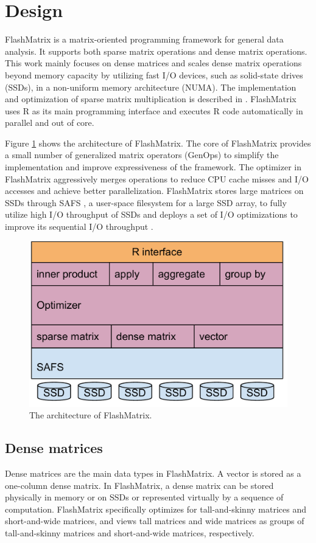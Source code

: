 \section{Design}

FlashMatrix is a matrix-oriented programming framework for general data analysis.
It supports both sparse matrix operations and dense matrix operations. This work
mainly focuses on dense matrices and scales dense matrix operations beyond
memory capacity by utilizing fast I/O devices, such as solid-state drives (SSDs),
in a non-uniform memory architecture (NUMA). The implementation and optimization
of sparse matrix multiplication is described in \cite{SEM_SpMM}.
FlashMatrix uses R as its main programming interface and executes R code
automatically in parallel and out of core.

Figure \ref{fig:arch} shows the architecture of FlashMatrix. The core of
FlashMatrix provides a small number of generalized matrix operators (GenOps)
to simplify the implementation and improve expressiveness of
the framework. The optimizer in FlashMatrix aggressively merges operations to
reduce CPU cache misses and I/O accesses and achieve better parallelization.
FlashMatrix stores large matrices on SSDs through SAFS \cite{safs},
a user-space filesystem for a large SSD array, to fully utilize high I/O
throughput of SSDs and deploys a set of I/O optimizations to improve
its sequential I/O throughput \cite{SEM_SpMM}.

\begin{figure}
\centering
\includegraphics[scale=0.3]{FlashMatrix_figs/architecture.pdf}
\caption{The architecture of FlashMatrix.}
\label{fig:arch}
\end{figure}

\subsection{Dense matrices}
Dense matrices are the main data types in FlashMatrix. A vector is stored
as a one-column dense matrix. In FlashMatrix, a dense matrix can be stored
physically in memory or on SSDs or represented virtually by a sequence of
computation. FlashMatrix specifically optimizes for tall-and-skinny matrices
and short-and-wide matrices, and views tall matrices and wide matrices
as groups of tall-and-skinny matrices and short-and-wide matrices, respectively.

